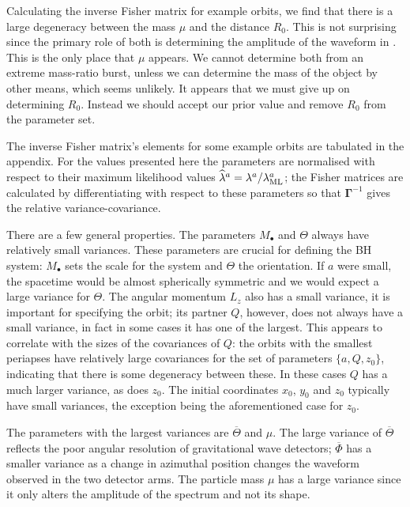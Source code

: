 Calculating the inverse Fisher matrix for example orbits, we find that there is a large degeneracy between the mass $\mu$ and the distance $R_0$. This is not surprising since the primary role of both is determining the amplitude of the waveform in . This is the only place that $\mu$ appears. We cannot determine both from an extreme mass-ratio burst, unless we can determine the mass of the object by other means, which seems unlikely. It appears that we must give up on determining $R_0$. Instead we should accept our prior value and remove $R_0$ from the parameter set.

The inverse Fisher matrix's elements for some example orbits are tabulated in the appendix. For the values presented here the parameters are normalised with respect to their maximum likelihood values $\widehat{\lambda}^a = \lambda^a/\lambda_\mathrm{ML}^a$; the Fisher matrices are calculated by differentiating with respect to these parameters so that $\boldsymbol{\Gamma}^{-1}$ gives the relative variance-covariance.

There are a few general properties. The parameters $M_\bullet$ and $\Theta$ always have relatively small variances. These parameters are crucial for defining the BH system: $M_\bullet$ sets the scale for the system and $\Theta$ the orientation. If $a$ were small, the spacetime would be almost spherically symmetric and we would expect a large variance for $\Theta$. The angular momentum $L_z$ also has a small variance, it is important for specifying the orbit; its partner $Q$, however, does not always have a small variance, in fact in some cases it has one of the largest. This appears to correlate with the sizes of the covariances of $Q$: the orbits with the smallest periapses have relatively large covariances for the set of parameters $\{a, Q, z_0\}$, indicating that there is some degeneracy between these. In these cases $Q$ has a much larger variance, as does $z_0$. The initial coordinates $x_0$, $y_0$ and $z_0$ typically have small variances, the exception being the aforementioned case for $z_0$.

The parameters with the largest variances are $\overline{\Theta}$ and $\mu$. The large variance of $\overline{\Theta}$ reflects the poor angular resolution of gravitational wave detectors; $\overline{\Phi}$ has a smaller variance as a change in azimuthal position changes the waveform observed in the two detector arms. The particle mass $\mu$ has a large variance since it only alters the amplitude of the spectrum and not its shape.

